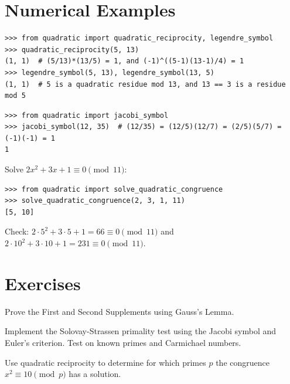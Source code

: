 \section{Numerical Examples}

\begin{example}
\begin{lstlisting}[style=python]
>>> from quadratic import quadratic_reciprocity, legendre_symbol
>>> quadratic_reciprocity(5, 13)
(1, 1)  # (5/13)*(13/5) = 1, and (-1)^((5-1)(13-1)/4) = 1
>>> legendre_symbol(5, 13), legendre_symbol(13, 5)
(1, 1)  # 5 is a quadratic residue mod 13, and 13 == 3 is a residue mod 5
\end{lstlisting}
\end{example}

\begin{example}
\begin{lstlisting}[style=python]
>>> from quadratic import jacobi_symbol
>>> jacobi_symbol(12, 35)  # (12/35) = (12/5)(12/7) = (2/5)(5/7) = (-1)(-1) = 1
1
\end{lstlisting}
\end{example}

\begin{example}
Solve $2x^2 + 3x + 1 \equiv 0 \pmod{11}$:
\begin{lstlisting}[style=python]
>>> from quadratic import solve_quadratic_congruence
>>> solve_quadratic_congruence(2, 3, 1, 11)
[5, 10]
\end{lstlisting}
Check: $2\cdot 5^2 + 3\cdot 5 + 1 = 66 \equiv 0 \pmod{11}$ and $2\cdot 10^2 + 3\cdot 10 + 1 = 231 \equiv 0 \pmod{11}$.
\end{example}

\section{Exercises}

\begin{exercise}
Prove the First and Second Supplements using Gauss's Lemma.
\end{exercise}

\begin{exercise}
Implement the Solovay-Strassen primality test using the Jacobi symbol and Euler's criterion. Test on known primes and Carmichael numbers.
\end{exercise}

\begin{exercise}
Use quadratic reciprocity to determine for which primes $p$ the congruence $x^2 \equiv 10 \pmod{p}$ has a solution.
\end{exercise}

